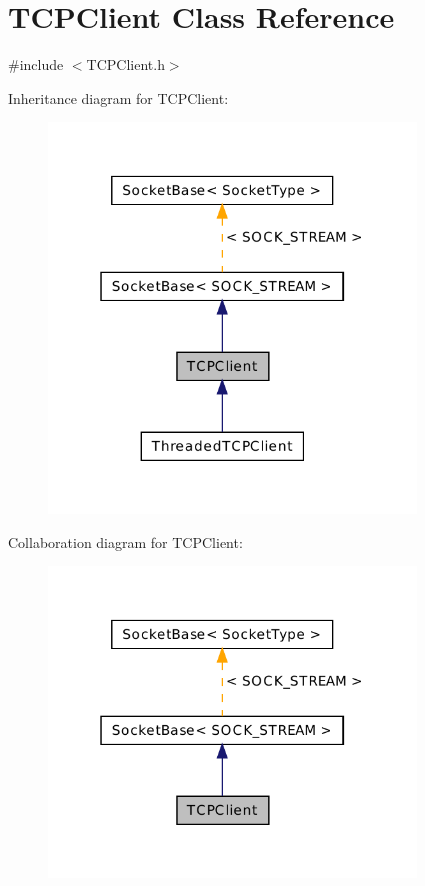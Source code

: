 \hypertarget{class_t_c_p_client}{\section{T\-C\-P\-Client Class Reference}
\label{class_t_c_p_client}
}


{\ttfamily \#include $<$T\-C\-P\-Client.\-h$>$}



Inheritance diagram for T\-C\-P\-Client\-:\nopagebreak
\begin{figure}[H]
\begin{center}
\leavevmode
\includegraphics[width=277pt]{class_t_c_p_client__inherit__graph}
\end{center}
\end{figure}


Collaboration diagram for T\-C\-P\-Client\-:\nopagebreak
\begin{figure}[H]
\begin{center}
\leavevmode
\includegraphics[width=277pt]{class_t_c_p_client__coll__graph}
\end{center}
\end{figure}
